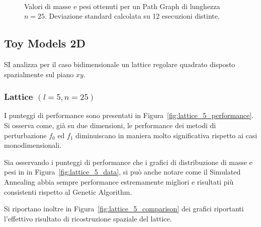 \documentclass[10pt,a4paper]{article}
\begin{document}
\begin{figure}[p]
    \centering
    \\
    \caption{Valori di masse e pesi ottenuti per un Path Graph di lunghezza \(n=25\). Deviazione standard calcolata su 12 esecuzioni distinte.}\label{fig:line_25_data}
\end{figure}

\subsection{Toy Models 2D}

SI analizza per il caso bidimensionale un lattice regolare quadrato disposto spazialmente sul piano \(xy\).

\subsubsection{Lattice \((l = 5, n = 25)\)}

I punteggi di performance sono presentati in Figura~\ref{fig:lattice_5_performance}.
Si osserva come, già su due dimensioni, le performance dei metodi di perturbazione \(f_0\) ed \(f_1\) diminuiscano in maniera molto significativa rispetto ai casi monodimensionali.

Sia osservando i punteggi di performance che i grafici di distribuzione di masse e pesi in in Figura~\ref{fig:lattice_5_data}, si può anche notare come il Simulated Annealing abbia sempre performance estremamente migliori e risultati più consistenti rispetto al Genetic Algorithm.

Si riportano inoltre in Figura~\ref{fig:lattice_5_comparison} dei grafici riportanti l'effettivo risultato di ricostruzione spaziale del lattice.
\end{document}
